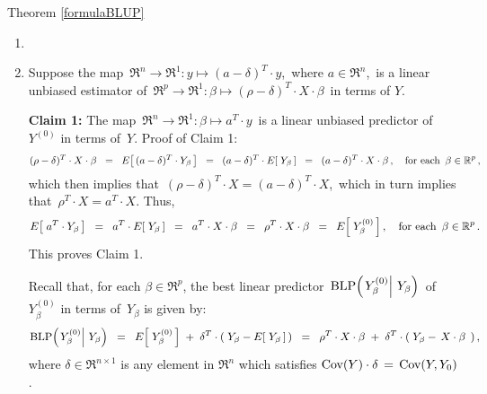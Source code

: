 \proofof Theorem \ref{formulaBLUP}
\begin{enumerate}
\item
\item
	Suppose the map
	\,$\Re^{n} \longrightarrow \Re^{1} : y \longmapsto (a - \delta)^{T}\cdot y$,\,
	where $a \in \Re^{n}$,\, is a linear unbiased estimator of 
	\,$\Re^{p} \longrightarrow \Re^{1} : \beta \longmapsto (\rho - \delta)^{T} \cdot X \cdot \beta$\,
	in terms of $Y$.

	\vskip 0.3cm
	\noindent
	\textbf{Claim 1:}\quad
	The map
	\,$\Re^{n} \longrightarrow \Re^{1} : \beta \longmapsto a^{T}\cdot y$\,
	is a linear unbiased predictor of \,$Y^{(0)}$ in terms of \,$Y$.
	\vskip 0.2cm
	\noindent
	Proof of Claim 1:\quad
	\begin{equation*}
	(\rho - \delta)^{T} \cdot X \cdot \beta
	\;\; = \;\;
		E\!\left[\,(a - \delta)^{T}\cdot Y_{\beta}\,\right]
	\;\; = \;\;
		(a - \delta)^{T} \cdot E\!\left[\;Y_{\beta}\,\right]
	\;\; = \;\;
		(a - \delta)^{T} \cdot X \cdot \beta\,,
	\quad
	\textnormal{for each \,$\beta \in \Re^{p}$}\,,
	\end{equation*}
	which then implies that \,$(\rho - \delta)^{T} \cdot X  = (a - \delta)^{T} \cdot X$,\,
	which in turn implies that \,$\rho^{T} \cdot X  = a^{T} \cdot X$.
	Thus,
	\begin{equation*}
	E\!\left[\;a^{T} \cdot Y_{\beta}\,\right]
	\;\; = \;\;
		a^{T} \cdot E\!\left[\;Y_{\beta}\,\right]
	\;\; = \;\;
		a^{T} \cdot X \cdot \beta
	\;\; = \;\;
		\rho^{T} \cdot X \cdot \beta
	\;\; = \;\;
		E\!\left[\;Y^{(0)}_{\beta}\,\right],
	\quad\textnormal{for each \,$\beta \in \Re^{p}$}\,.
	\end{equation*}
	This proves Claim 1.

	\vskip 0.8cm
	\noindent
	Recall that, for each $\beta \in \Re^{p}$, the best linear predictor
	\,$\blp\!\left(\left.Y^{(0)}_{\beta}\right\vert\,Y_{\beta}\right)$\, of
	\,$Y^{(0)}_{\beta}$ in terms of \,$Y_{\beta}$ is given by:
	\begin{equation*}
	\blp\!\left(\left.Y^{(0)}_{\beta}\right\vert\,Y_{\beta}\right)
	\;\; = \;\;
		E\!\left[\;Y^{(0)}_{\beta}\,\right] \; + \; \delta^{T}\cdot(\;Y_{\beta} - E\!\left[\;Y_{\beta}\,\right]\,)
	\;\; = \;\;
		\rho^{T}\cdot X \cdot\beta \; + \; \delta^{T}\cdot(\;Y_{\beta} - \,X\cdot\beta\,\;)\,,
	\end{equation*}
	where $\delta \in \Re^{n \times 1}$ is any element in $\Re^{n}$ which satisfies
	$\Cov(Y) \cdot \delta \,=\, \Cov(Y,Y_{0})$.


\end{enumerate}
